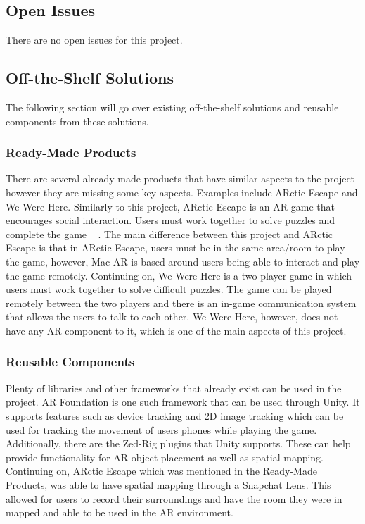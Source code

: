\documentclass[12pt]{article}
\begin{document}
\subsection{Open Issues}
There are no open issues for this project.

\subsection{Off-the-Shelf Solutions}
The following section will go over existing off-the-shelf solutions and reusable components from these solutions.

\subsubsection{Ready-Made Products}
There are several already made products that have similar aspects to the project however they are missing some key aspects. Examples include ARctic Escape and We Were Here. Similarly to this project, ARctic Escape is an AR game that encourages social interaction. Users must work together to solve puzzles and complete the game ~\citep{ARcticEscape} . The main difference between this project and ARctic Escape is that in ARctic Escape, users must be in the same area/room to play the game, however, Mac-AR is based around users being able to interact and play the game remotely. Continuing on, We Were Here is a two player game in which users must work together to solve difficult puzzles. The game can be played remotely between the two players and there is an in-game communication system that allows the users to talk to each other. We Were Here, however, does not have any AR component to it, which is one of the main aspects of this project.

\subsubsection{Reusable Components}
Plenty of libraries and other frameworks that already exist can be used in the project. AR Foundation is one such framework that can be used through Unity. It supports features such as device tracking and 2D image tracking which can be used for tracking the movement of users phones while playing the game. Additionally, there are the Zed-Rig plugins that Unity supports. These can help provide functionality for AR object placement as well as spatial mapping. Continuing on, ARctic Escape which was mentioned in the Ready-Made Products, was able to have spatial mapping through a Snapchat Lens. This allowed for users to record their surroundings and have the room they were in mapped and able to be used in the AR environment.
\end{document}
